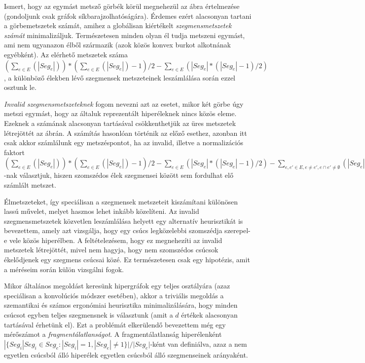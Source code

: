 Ismert, hogy az egymást metsző görbék körül megnehezül az ábra értelmezése (gondoljunk csak gráfok síkbarajzolhatóságára). Érdemes ezért alacsonyan tartani a görbemetszetek számát, amihez a globálisan kiértékelt \textit{szegmensmetszetek számát} minimalizáljuk. Természetesen minden olyan él tudja metszeni egymást, ami nem ugyanazon élből származik (azok közös konvex burkot alkotnának egyébként). Az elérhető metszetek száma $(\sum_{e \in E}(|Seg_e|))*(\sum_{e \in E}(|Seg_e|)-1) / 2 - \sum_{e \in E}(|Seg_e|*(|Seg_e|-1) / 2)$, a különböző élekben lévő szegmensek metszeteinek leszámlálása során ezzel osztunk le.


\textit{Invalid szegmensmetszeteknek} fogom nevezni azt az esetet, mikor két görbe úgy metszi egymást, hogy az általuk reprezentált hiperéleknek nincs közös eleme. Ezeknek a számának alacsonyan tartásával csökkenthetjük az üres metszetek létrejöttét az ábrán. A számítás hasonlóan történik az előző esethez, azonban itt csak akkor számlálunk egy metszéspontot, ha az invalid, illetve a normalizációs faktort $(\sum_{e \in E}(|Seg_e|))*(\sum_{e \in E}(|Seg_e|)-1) / 2 - \sum_{e \in E}(|Seg_e|*(|Seg_e|-1) / 2) - \sum_{e, e' \in E, e \neq e', e \cap e' \neq \emptyset}(|Seg_e|*|Seg_{e'}|)$-nak választjuk, hiszen szomszédos élek szegmensei között sem fordulhat elő számlált metszet.


Élmetszeteket, így speciálisan a szegmensek metszeteit kiszámítani különösen lassú művelet, melyet hasznos lehet inkább közelíteni. Az invalid szegmensmetszetek közvetlen leszámlálása helyett egy alternatív heurisztikát is bevezettem, amely azt vizsgálja, hogy egy csúcs legközelebbi szomszédja szerepel-e vele közös hiperélben. A feltételezésem, hogy ez megnehezíti az invalid metszetek létrejöttét, mivel nem hagyja, hogy nem szomszédos csúcsok ékelődjenek egy szegmens csúcsai közé. Ez természetesen csak egy hipotézis, amit a méréseim során külön vizsgálni fogok.


Mikor általános megoldást keresünk hipergráfok egy teljes osztályára (azaz speciálisan a konvolúciós módszer esetében), akkor a triviális megoldás a szemantikai és számos ergonómiai heurisztika minimalizálására, hogy minden csúcsot egyben teljes szegmensnek is választunk (amit a $d$ értékek alacsonyan tartásával érhetünk el). Ezt a problémát elkerülendő bevezettem még egy mérőszámot a \textit{fragmentálatlanságot}. A fragmentálatlanság hiperélenként $|\{Seg_i | Seg_i \in Seg_e : |Seg_i| = 1, |Seg_e| \neq 1\}| / |Seg_e|$-ként van definiálva, azaz a nem egyetlen csúcsból álló hiperélek egyetlen csúcsból álló szegmenseinek arányaként.


